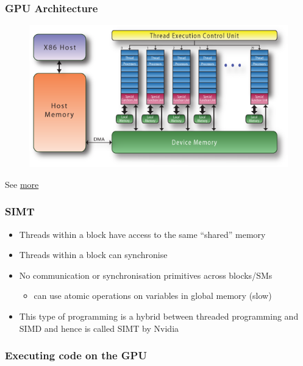 \subsubsection{GPU Architecture}\label{gpu-architecture}

\begin{figure}[htbp]
\centering
\includegraphics{10Accelerators/figures/pgi-nvidia-block-diagram.png}
\end{figure}

See
\href{http://www.gris.informatik.tu-darmstadt.de/cuda-workshop/tutorial/Advanced_CUDA_01.pdf}{more}

\subsubsection{SIMT}\label{simt}

\begin{itemize}
\itemsep1pt\parskip0pt
\item
  Threads within a block have access to the same ``shared'' memory
\item
  Threads within a block can synchronise
\item
  No communication or synchronisation primitives across blocks/SMs

  \begin{itemize}
  \itemsep1pt\parskip0pt
  \item
    can use atomic operations on variables in global memory (slow)
  \end{itemize}
\item
  This type of programming is a hybrid between threaded programming and
  SIMD and hence is called SIMT by Nvidia
\end{itemize}

\subsubsection{Executing code on the
GPU}\label{executing-code-on-the-gpu}

